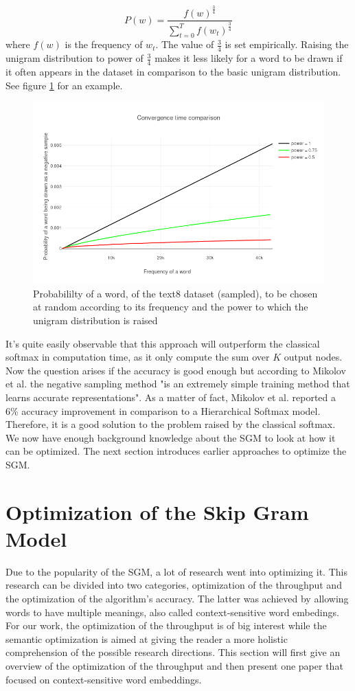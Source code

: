 \begin{equation} \label{eq:unigram}
P(w)=\frac{f(w)^{\frac{3}{4}}}{\sum_{t=0}^{T} f(w_t)^{\frac{3}{4}}}
\end{equation}
where $f(w)$ is the frequency of $w_t$. The value of $\frac{3}{4}$ is set empirically. Raising the unigram distribution to power of $\frac{3}{4}$ makes it less likely for a word to be drawn if it often appears in the dataset in comparison to the basic unigram distribution. See figure \ref{fig:frequency_ex} for an example.
\begin{figure}[ht]
\centering
\includegraphics[scale=0.45]{images/frequency_ex}
\caption{Probabililty of a word, of the text8 dataset (sampled), to be chosen at random according to its frequency and the power to which the unigram distribution is raised}
\label{fig:frequency_ex}
\end{figure}
It's quite easily observable that this approach will outperform the classical softmax in computation time, as it only compute the sum over $K$ output nodes. Now the question arises if the accuracy is good enough but according to Mikolov et al. \cite{mikolov2} the negative sampling method "is an extremely simple training method that learns accurate representations". As a matter of fact, Mikolov et al. \cite{mikolov2} reported a 6\% accuracy improvement in comparison to a Hierarchical Softmax model. Therefore, it is a good solution to the problem raised by the classical softmax.
We now have enough background knowledge about the SGM to look at how it can be optimized. The next section introduces earlier approaches to optimize the SGM.

\section{Optimization of the Skip Gram Model}
Due to the popularity of the SGM, a lot of research went into optimizing it. This research can be divided into two categories, optimization of the throughput and the optimization of the algorithm's accuracy. The latter was achieved by allowing words to have multiple meanings, also called context-sensitive word embedings. For our work, the optimization of the throughput is of big interest while the semantic optimization is aimed at giving the reader a more holistic comprehension of the possible research directions.
This section will first give an overview of the optimization of the throughput and then present one paper that focused on context-sensitive word embeddings.

